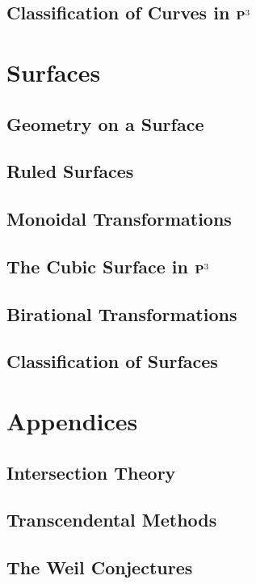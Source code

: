 \documentclass[oneside]{amsbook}
\begin{document}
\section{Classification of Curves in $\mathbf{P}^3$}


\chapter{Surfaces}
\section{Geometry on a Surface}

\section{Ruled Surfaces}

\section{Monoidal Transformations}

\section{The Cubic Surface in $\mathbf{P}^3$}

\section{Birational Transformations}

\section{Classification of Surfaces}


\chapter*{Appendices}
\renewcommand{\thesection}{\Alph{section}}
\setcounter{section}{0}
\section{Intersection Theory}


\section{Transcendental Methods}


\section{The Weil Conjectures}

\end{document}
